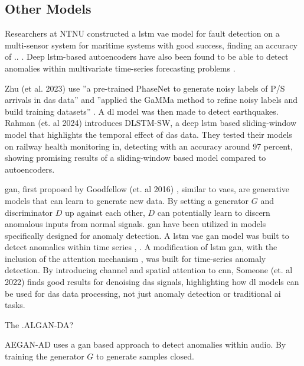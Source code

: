 \subsection{Other Models}

Researchers at NTNU constructed a \acrshort{lstm} \acrshort{vae} model for fault detection on a multi-sensor system for maritime systems \cite{9514856} with good success, finding an accuracy of .. . Deep \acrshort{lstm}-based autoencoders have also been found to be able to detect anomalies within multivariate time-series forecasting problems \cite{alaaDeepLstm2019}.

Zhu (et al. 2023) use ''a pre-trained PhaseNet to generate noisy labels of P/S arrivals in \acrshort{das} data'' and ''applied the GaMMa method to refine noisy labels and build training datasets'' \cite{zhu2023seismic}. A \acrshort{dl} model was then made to detect earthquakes. \\

Rahman (et. al 2024) \cite{10.1115/JRC2024-124137} introduces DLSTM-SW, a deep \acrfull{lstm} based sliding-window model that highlights the temporal effect of \acrshort{das} data. They tested their models on railway health monitoring in, detecting with an accuracy around 97 percent, showing promising results of a sliding-window based model compared to autoencoders.

\acrshort{gan}, first proposed by Goodfellow (et. al 2016) \cite{goodfellow2016nips}, similar to \acrshort{vae}s, are generative models that can learn to generate new data. By setting a generator $G$ and discriminator $D$ up against each other, $D$ can potentially learn to discern anomalous inputs from normal signals. \acrshort{gan} have been utilized in models specifically designed for anomaly detection. A \acrshort{lstm} \acrshort{vae} \acrshort{gan} model was built to detect anomalies within time series \cite{s20133738}, .  A modification of \acrshort{lstm} \acrshort{gan}, with the inclusion of the attention mechanism \cite{vaswani2017attention}, was built for time-series anomaly detection. By introducing channel and spatial attention to \acrshort{cnn}, Someone (et. al 2022) \cite{eage:/content/journals/10.1111/1365-2478.13355} finds good results for denoising \acrshort{das} signals, highlighting how \acrshort{dl} models can be used for \acrshort{das} data processing, not just anomaly detection or traditional \acrshort{ai} tasks. 

The  \cite{bashar2023algan}.ALGAN-DA?

AEGAN-AD \cite{jiang2023unsupervised} uses a \acrshort{gan} based approach to detect anomalies within audio. By training the generator $G$ to generate samples closed. 



